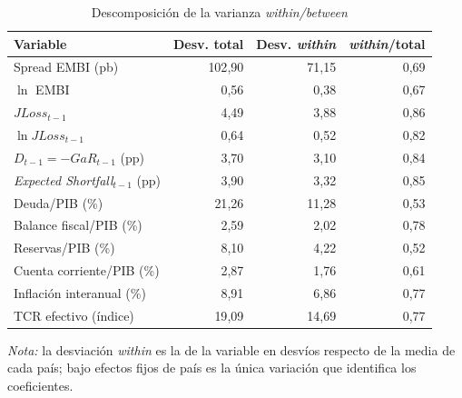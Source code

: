 \begin{table}[htbp]
\centering
\small
\caption{Descomposición de la varianza \textit{within/between}}
\label{tab:varianza}
\begin{tabular}{lrrr}
\toprule
Variable & Desv. total & Desv. \textit{within} & \textit{within}/total \\
\midrule
Spread EMBI (pb) & 102{,}90 & 71{,}15 & 0{,}69 \\
$\ln$ EMBI & 0{,}56 & 0{,}38 & 0{,}67 \\
$JLoss_{t-1}$ & 4{,}49 & 3{,}88 & 0{,}86 \\
$\ln JLoss_{t-1}$ & 0{,}64 & 0{,}52 & 0{,}82 \\
$D_{t-1}=-GaR_{t-1}$ (pp) & 3{,}70 & 3{,}10 & 0{,}84 \\
\textit{Expected Shortfall}$_{t-1}$ (pp) & 3{,}90 & 3{,}32 & 0{,}85 \\
Deuda/PIB (\%) & 21{,}26 & 11{,}28 & 0{,}53 \\
Balance fiscal/PIB (\%) & 2{,}59 & 2{,}02 & 0{,}78 \\
Reservas/PIB (\%) & 8{,}10 & 4{,}22 & 0{,}52 \\
Cuenta corriente/PIB (\%) & 2{,}87 & 1{,}76 & 0{,}61 \\
Inflación interanual (\%) & 8{,}91 & 6{,}86 & 0{,}77 \\
TCR efectivo (índice) & 19{,}09 & 14{,}69 & 0{,}77 \\
\bottomrule
\end{tabular}
\par\smallskip\parbox{0.8\linewidth}{\footnotesize \textit{Nota:} la desviación \textit{within} es la de la variable en desvíos respecto de la media de cada país; bajo efectos fijos de país es la única variación que identifica los coeficientes.}
\end{table}
